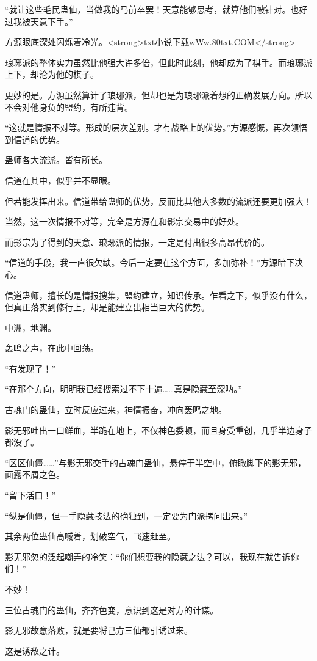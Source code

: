 \begin{this_body}
“就让这些毛民蛊仙，当做我的马前卒罢！天意能够思考，就算他们被针对。也好过我被天意下手。”

方源眼底深处闪烁着冷光。<strong>txt小说下载wWw.80txt.COM</strong>

琅琊派的整体实力虽然比他强大许多倍，但此时此刻，他却成为了棋手。而琅琊派上下，却沦为他的棋子。

更妙的是。方源虽然算计了琅琊派，但却也是为琅琊派着想的正确发展方向。所以不会对他身负的盟约，有所违背。

“这就是情报不对等。形成的层次差别。才有战略上的优势。”方源感慨，再次领悟到信道的优势。

蛊师各大流派。皆有所长。

信道在其中，似乎并不显眼。

但若能发挥出来。信道带给蛊师的优势，反而比其他大多数的流派还要更加强大！

当然，这一次情报不对等，完全是方源在和影宗交易中的好处。

而影宗为了得到的天意、琅琊派的情报，一定是付出很多高昂代价的。

“信道的手段，我一直很欠缺。今后一定要在这个方面，多加弥补！”方源暗下决心。

信道蛊师，擅长的是情报搜集，盟约建立，知识传承。乍看之下，似乎没有什么，但真正落实到修行上，却是能建立出相当巨大的优势。

中洲，地渊。

轰鸣之声，在此中回荡。

“有发现了！”

“在那个方向，明明我已经搜索过不下十遍……真是隐藏至深呐。”

古魂门的蛊仙，立时反应过来，神情振奋，冲向轰鸣之地。

影无邪吐出一口鲜血，半跪在地上，不仅神色委顿，而且身受重创，几乎半边身子都没了。

“区区仙僵……”与影无邪交手的古魂门蛊仙，悬停于半空中，俯瞰脚下的影无邪，面露不屑之色。

“留下活口！”

“纵是仙僵，但一手隐藏技法的确独到，一定要为门派拷问出来。”

其余两位蛊仙高喊着，划破空气，飞速赶至。

影无邪忽的泛起嘲弄的冷笑：“你们想要我的隐藏之法？可以，我现在就告诉你们！”

不妙！

三位古魂门的蛊仙，齐齐色变，意识到这是对方的计谋。

影无邪故意落败，就是要将己方三仙都引诱过来。

这是诱敌之计。


\end{this_body}
